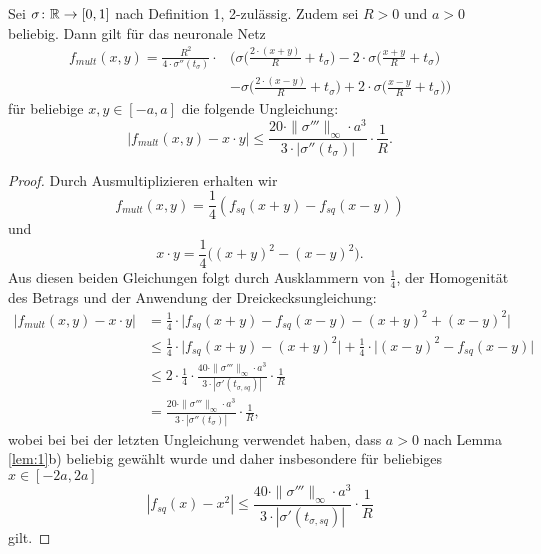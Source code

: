 \begin{lem}
  \label{lem:2}
  Sei $\sigma \colon \mathbb{R} \to [0, 1]$ nach Definition 1, 2-zulässig. Zudem sei $R > 0$ und $a > 0$ beliebig. Dann gilt für das neuronale Netz
  \begin{equation*}
  	\begin{split}
  	f_{mult}(x, y) = \frac{R^2}{4 \cdot \sigma''(t_{\sigma})} \cdot & \bigg(\sigma\Big(\frac{2 \cdot (x + y)}{R} + t_{\sigma} \Big) - 2 \cdot \sigma\Big(\frac{x + y}{R} + t_{\sigma}\Big) \\
  	& - \sigma \Big(\frac{2 \cdot (x - y)}{R} + t_{\sigma} \Big) + 2 \cdot \sigma \Big(\frac{x - y}{R} + t_{\sigma} \Big) \bigg)
  	\end{split}
  	\end{equation*}
  	für beliebige $x, y \in [-a, a]$ die folgende Ungleichung$\colon$
  	$$|f_{mult}(x, y) - x \cdot y| \leq \frac{20 \cdot \|\sigma'''\|_{\infty} \cdot a ^3}{3 \cdot |\sigma''(t_{\sigma})|} \cdot \frac{1}{R}.$$
  \end{lem}
  \begin{proof}
  Durch Ausmultiplizieren erhalten wir $$f_{mult}(x,y) = \frac{1}{4}(f_{sq}(x + y) - f_{sq}(x - y))$$ und $$x \cdot y = \frac{1}{4}\big((x + y)^2 - (x - y)^2\big).$$
  Aus diesen beiden Gleichungen folgt durch Ausklammern von $\frac{1}{4}$, der Homogenität des Betrags und der Anwendung der Dreickecksungleichung$\colon$
  \begin{equation*}
  \begin{split}
  |f_{mult}(x, y) - x \cdot y| & = \frac{1}{4} \cdot \big|f_{sq}(x + y) - f_{sq}(x - y) - (x + y)^2 + (x - y)^2\big| \\
  & \leq \frac{1}{4} \cdot \big|f_{sq}(x + y) - (x + y)^2\big| + \frac{1}{4}\cdot\big| (x - y)^2 - f_{sq}(x - y)\big| \\
  & \leq 2 \cdot \frac{1}{4} \cdot \frac{40 \cdot \|\sigma'''\|_{\infty} \cdot a^3}{3 \cdot |\sigma'(t_{\sigma, sq})|} \cdot \frac{1}{R} \\
  & = \frac{20 \cdot \|\sigma'''\|_{\infty} \cdot a ^3}{3 \cdot |\sigma''(t_{\sigma})|} \cdot \frac{1}{R},
  \end{split}
\end{equation*}   
wobei bei bei der letzten Ungleichung verwendet haben, dass $a > 0$ nach Lemma \ref{lem:1}b) beliebig gewählt wurde und daher insbesondere für beliebiges $x \in [-2a,2a]$ $$ |f_{sq}(x) - x^2| \leq \frac{40 \cdot \|\sigma'''\|_{\infty} \cdot a^3}{3 \cdot |\sigma'(t_{\sigma, sq})|} \cdot \frac{1}{R}$$ gilt. 
  \end{proof}
